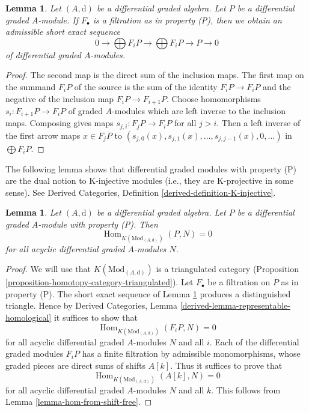 \documentclass{stacks-project}
\theoremstyle{plain}
\newtheorem{lemma}[subsection]{Lemma}
\theoremstyle{definition}
\theoremstyle{remark}
\numberwithin{equation}{subsection}
\def\Hom{\mathop{\mathrm{Hom}}\nolimits}
\begin{document}
\begin{lemma}
\label{lemma-property-P-sequence}
Let $(A, \text{d})$ be a differential graded algebra.
Let $P$ be a differential graded $A$-module. If $F_\bullet$
is a filtration as in property (P), then we obtain an
admissible short exact sequence
$$
0 \to
\bigoplus\nolimits F_iP \to
\bigoplus\nolimits F_iP \to P \to 0
$$
of differential graded $A$-modules.
\end{lemma}

\begin{proof}
The second map is the direct sum of the inclusion maps.
The first map on the summand $F_iP$ of the source is the sum
of the identity $F_iP \to F_iP$ and the negative of the inclusion
map $F_iP \to F_{i + 1}P$. Choose homomorphisms $s_i : F_{i + 1}P \to F_iP$
of graded $A$-modules which are left inverse to the inclusion maps.
Composing gives maps $s_{j, i} : F_jP \to F_iP$ for all $j > i$.
Then a left inverse of the first arrow maps $x \in F_jP$ to
$(s_{j, 0}(x), s_{j, 1}(x), \ldots, s_{j, j - 1}(x), 0, \ldots)$
in $\bigoplus F_iP$.
\end{proof}

\noindent
The following lemma shows that differential graded modules with
property (P) are the dual notion to K-injective modules
(i.e., they are K-projective in some sense). See
Derived Categories, Definition \ref{derived-definition-K-injective}.

\begin{lemma}
\label{lemma-property-P-K-projective}
Let $(A, \text{d})$ be a differential graded algebra.
Let $P$ be a differential graded $A$-module with property (P).
Then
$$
\Hom_{K(\text{Mod}_{(A, \text{d})})}(P, N) = 0
$$
for all acyclic differential graded $A$-modules $N$.
\end{lemma}

\begin{proof}
We will use that $K(\text{Mod}_{(A, \text{d})})$ is a triangulated
category (Proposition \ref{proposition-homotopy-category-triangulated}).
Let $F_\bullet$ be a filtration on $P$ as in property (P).
The short exact sequence of Lemma \ref{lemma-property-P-sequence}
produces a distinguished triangle. Hence by
Derived Categories, Lemma \ref{derived-lemma-representable-homological}
it suffices to show that
$$
\Hom_{K(\text{Mod}_{(A, \text{d})})}(F_iP, N) = 0
$$
for all acyclic differential graded $A$-modules $N$ and all $i$.
Each of the differential graded modules $F_iP$ has a finite filtration
by admissible monomorphisms, whose graded pieces are direct sums
of shifts $A[k]$. Thus it suffices to prove that
$$
\Hom_{K(\text{Mod}_{(A, \text{d})})}(A[k], N) = 0
$$
for all acyclic differential graded $A$-modules $N$ and all $k$.
This follows from Lemma \ref{lemma-hom-from-shift-free}.
\end{proof}
\end{document}

